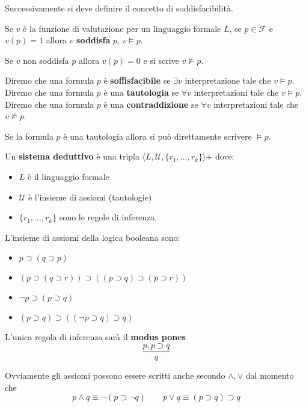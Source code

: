 Successivamente si deve definire il concetto di soddisfacibilità.

\begin{definizione} 
    Se $v$ è la funzione di valutazione per un linguaggio formale $L$, se $p\in \mathcal{F}$
    e $v(p) = 1$ allora $v$ \textbf{soddisfa} $p$, $v\vDash p$.
\end{definizione}

Se $v$ non soddisfa $p$ allora $v(p) = 0$ e si scrive $v\not\vDash p$.

Diremo che una formula $p$ è \textbf{soffisfacibile} se $\exists v$ interpretazione 
tale che $v\vDash p$. Diremo che una formula $p$ è una \textbf{tautologia} se $\forall v$ interpretazioni
tale che $v\vDash p$. Diremo che una formula $p$ è una \textbf{contraddizione} se $\forall v$ interpretazioni
tale che $v\not \vDash p$.

\begin{nota}
    Se la formula $p$ è una tautologia allora si può direttamente scrivere $\vDash p$.
\end{nota}

\begin{definizione} 
    Un \textbf{sistema deduttivo} è una tripla $\langle L, \mathcal{U}, \{r_1,\dots, r_k\}\rangle$+
    dove:
    \begin{itemize}
        \item $L$ è il linguaggio formale
        \item $\mathcal{U}$ è l'insieme di assiomi (tautologie)
        \item $\{r_1,\dots, r_k\}$ sono le regole di inferenza.
    \end{itemize}
\end{definizione}

L'insieme di assiomi della logica booleana sono:
\begin{itemize}
    \item $p\supset (q \supset p)$
    \item $(p\supset (q \supset r))\supset ((p\supset q)\supset (p\supset r))$
    \item $\lnot p \supset(p\supset q)$
    \item $(p\supset q) \supset((\lnot p\supset q)\supset q)$
\end{itemize}

L'unica regola di inferenza sarà il \textbf{modus pones}
$$\frac{p,p\supset q}{q}$$

Ovviamente gli assiomi possono essere scritti anche secondo $\land,\lor$ dal momento 
che 
$$p\land q \equiv \lnot(p\supset \lnot q) \qquad p\lor q \equiv (p\supset q )\supset q$$

